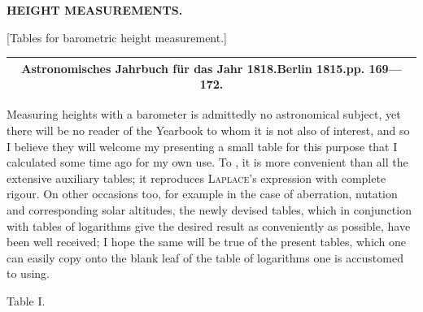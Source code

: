 \par\clearpage
\noindent{}\hfill{\small\textbf{HEIGHT MEASUREMENTS.}}\hfill\null\par\medskip
\vspace*{.23\textheight}
\begin{center}
[Tables for barometric height measurement.]
\par\bigskip
{\footnotesize
\begin{tabular}{c}
\hline
Astronomisches Jahrbuch für das Jahr 1818.\quad Berlin 1815.\quad pp. 169---172.\\
\hline
\end{tabular}}
\end{center}
\par\noindent\hspace*{\parindent}Measuring heights with a barometer is admittedly no astronomical subject,
yet there will be no reader of the Yearbook to whom it is not also of interest,
and so I believe they will welcome my presenting a small table for this purpose
that I calculated some time ago for my own use. To , it is
more convenient than all the extensive auxiliary tables; it reproduces
\textsc{Laplace}'s expression with complete rigour. On other occasions too, for example in the case of aberration,
nutation and corresponding solar altitudes, the newly devised tables, which in conjunction with
tables of logarithms give the desired result as conveniently as possible, have been well received; I hope
the same will be true of the present tables, which one can easily copy onto
the blank leaf of the table of logarithms one is accustomed to using.
\begin{center}Table I.\end{center}

